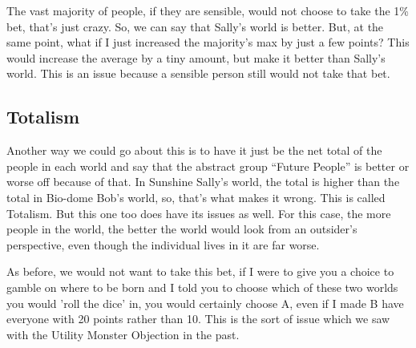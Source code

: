 The vast majority of people, if they are sensible, would not choose to take the 1\% bet, that's just crazy. So, we can say that Sally's world is better. But, at the same point, what if I just increased the majority's max by just a few points? This would increase the average by a tiny amount, but make it better than Sally's world. This is an issue because a sensible person still would not take that bet. 
\subsection{Totalism}

Another way we could go about this is to have it just be the net total of the people in each world and say that the abstract group “Future People” is better or worse off because of that. In Sunshine Sally’s world, the total is higher than the total in Bio-dome Bob’s world, so, that’s what makes it wrong. This is called Totalism. But this one too does have its issues as well. For this case, the more people in the world, the better the world would look from an outsider's perspective, even though the individual lives in it are far worse.


As before, we would not want to take this bet, if I were to give you a choice to gamble on where to be born and I told you to choose which of these two worlds you would 'roll the dice' in, you would certainly choose A, even if I made B have everyone with 20 points rather than 10. This is the sort of issue which we saw with the Utility Monster Objection in the past.